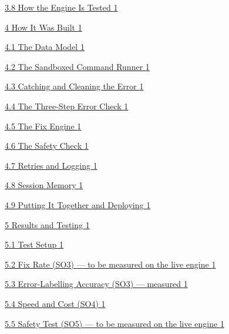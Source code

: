 \documentclass[
]{article}
\begin{document}
\protect\hyperlink{how-the-engine-is-tested}{3.8 How the Engine Is
Tested \protect\hyperlink{how-the-engine-is-tested}{1}}

\protect\hyperlink{how-it-was-built}{4 How It Was Built
\protect\hyperlink{how-it-was-built}{1}}

\protect\hyperlink{the-data-model}{4.1 The Data Model
\protect\hyperlink{the-data-model}{1}}

\protect\hyperlink{the-sandboxed-command-runner}{4.2 The Sandboxed
Command Runner \protect\hyperlink{the-sandboxed-command-runner}{1}}

\protect\hyperlink{catching-and-cleaning-the-error}{4.3 Catching and
Cleaning the Error
\protect\hyperlink{catching-and-cleaning-the-error}{1}}

\protect\hyperlink{the-three-step-error-check-1}{4.4 The Three-Step
Error Check \protect\hyperlink{the-three-step-error-check-1}{1}}

\protect\hyperlink{the-fix-engine}{4.5 The Fix Engine
\protect\hyperlink{the-fix-engine}{1}}

\protect\hyperlink{the-safety-check}{4.6 The Safety Check
\protect\hyperlink{the-safety-check}{1}}

\protect\hyperlink{retries-and-logging}{4.7 Retries and Logging
\protect\hyperlink{retries-and-logging}{1}}

\protect\hyperlink{session-memory}{4.8 Session Memory
\protect\hyperlink{session-memory}{1}}

\protect\hyperlink{putting-it-together-and-deploying}{4.9 Putting It
Together and Deploying
\protect\hyperlink{putting-it-together-and-deploying}{1}}

\protect\hyperlink{results-and-testing}{5 Results and Testing
\protect\hyperlink{results-and-testing}{1}}

\protect\hyperlink{test-setup}{5.1 Test Setup
\protect\hyperlink{test-setup}{1}}

\protect\hyperlink{fix-rate-so3---to-be-measured-on-the-live-engine}{5.2
Fix Rate (SO3) --- to be measured on the live engine
\protect\hyperlink{fix-rate-so3---to-be-measured-on-the-live-engine}{1}}

\protect\hyperlink{error-labelling-accuracy-so3-measured}{5.3
Error-Labelling Accuracy (SO3) --- measured
\protect\hyperlink{error-labelling-accuracy-so3-measured}{1}}

\protect\hyperlink{speed-and-cost-so4}{5.4 Speed and Cost (SO4)
\protect\hyperlink{speed-and-cost-so4}{1}}

\protect\hyperlink{safety-test-so5-to-be-measured-on-the-live-engine}{5.5
Safety Test (SO5) --- to be measured on the live engine
\protect\hyperlink{safety-test-so5-to-be-measured-on-the-live-engine}{1}}
\end{document}
